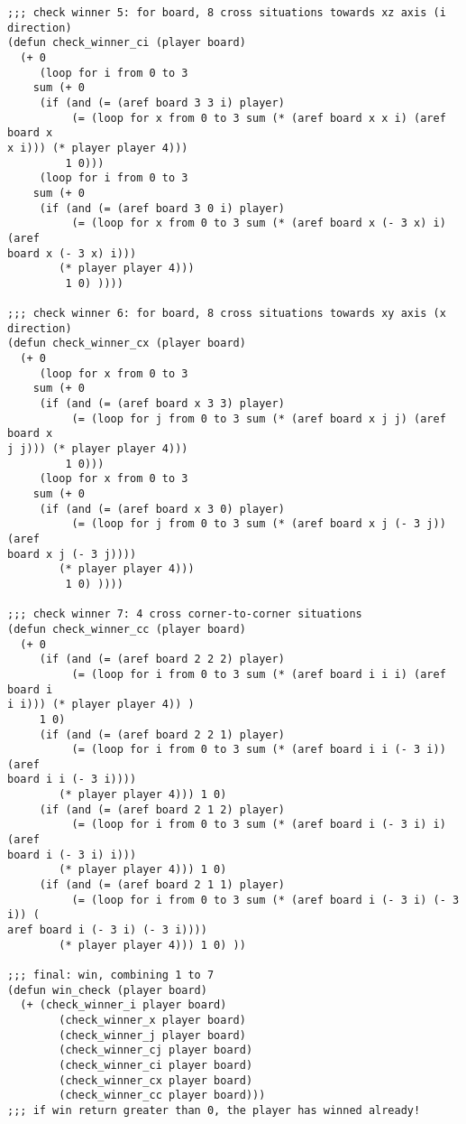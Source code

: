 \documentclass[12pt]{book}
\begin{document}
\begin{lstlisting}
;;; check winner 5: for board, 8 cross situations towards xz axis (i 
direction)
(defun check_winner_ci (player board)
  (+ 0
     (loop for i from 0 to 3 
    sum (+ 0 
     (if (and (= (aref board 3 3 i) player)
          (= (loop for x from 0 to 3 sum (* (aref board x x i) (aref board x
x i))) (* player player 4)))
         1 0)))
     (loop for i from 0 to 3
    sum (+ 0
     (if (and (= (aref board 3 0 i) player)
          (= (loop for x from 0 to 3 sum (* (aref board x (- 3 x) i) (aref 
board x (- 3 x) i)))
        (* player player 4)))
         1 0) ))))

;;; check winner 6: for board, 8 cross situations towards xy axis (x 
direction)
(defun check_winner_cx (player board)
  (+ 0
     (loop for x from 0 to 3 
    sum (+ 0 
     (if (and (= (aref board x 3 3) player)
          (= (loop for j from 0 to 3 sum (* (aref board x j j) (aref board x
j j))) (* player player 4)))
         1 0)))
     (loop for x from 0 to 3
    sum (+ 0
     (if (and (= (aref board x 3 0) player)
          (= (loop for j from 0 to 3 sum (* (aref board x j (- 3 j)) (aref 
board x j (- 3 j))))
        (* player player 4)))
         1 0) ))))

;;; check winner 7: 4 cross corner-to-corner situations
(defun check_winner_cc (player board)
  (+ 0
     (if (and (= (aref board 2 2 2) player)
          (= (loop for i from 0 to 3 sum (* (aref board i i i) (aref board i
i i))) (* player player 4)) )
     1 0)
     (if (and (= (aref board 2 2 1) player)
          (= (loop for i from 0 to 3 sum (* (aref board i i (- 3 i)) (aref 
board i i (- 3 i))))
        (* player player 4))) 1 0)
     (if (and (= (aref board 2 1 2) player)
          (= (loop for i from 0 to 3 sum (* (aref board i (- 3 i) i) (aref 
board i (- 3 i) i)))
        (* player player 4))) 1 0)
     (if (and (= (aref board 2 1 1) player)
          (= (loop for i from 0 to 3 sum (* (aref board i (- 3 i) (- 3 i)) (
aref board i (- 3 i) (- 3 i))))
        (* player player 4))) 1 0) ))
     
;;; final: win, combining 1 to 7
(defun win_check (player board)
  (+ (check_winner_i player board)
        (check_winner_x player board)
        (check_winner_j player board)
        (check_winner_cj player board)
        (check_winner_ci player board)
        (check_winner_cx player board)
        (check_winner_cc player board)))
;;; if win return greater than 0, the player has winned already!


\end{lstlisting}
\end{document}
